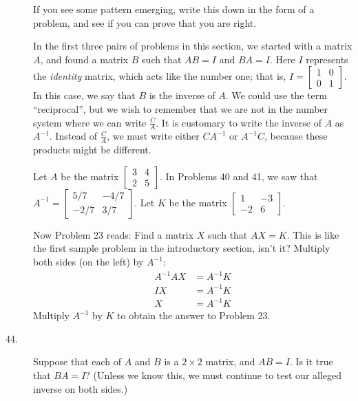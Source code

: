 \documentclass{article}
\begin{document}
\begin{description}
  \item[] If you see some pattern emerging, write this down in the form of a problem, and see if you can prove that you are right.

  \item[] In the first three pairs of problems in this section, we started with a matrix $A$, and found a matrix $B$ such that $AB = I$ and $BA = I$. Here $I$ represents the \emph{identity} matrix, which acts like the number one; that is, $I = \begin{bmatrix} 1 & 0 \\ 0 & 1 \end{bmatrix}$. In this case, we say that $B$ is the inverse of $A$. We could use the term ``reciprocal'', but we wish to remember that we are not in the number system where we can write $\frac{C}{A}$. It is customary to write the inverse of $A$ as $A^{-1}$. Instead of $\frac{C}{A}$, we must write either $CA^{-1}$ or $A^{-1}C$, because these products might be different.

  \item[] Let $A$ be the matrix $\begin{bmatrix} 3 & 4 \\ 2 & 5 \end{bmatrix}$. In Problems 40 and 41, we saw that $A^{-1} = \begin{bmatrix} 5/7 & -4/7 \\ -2/7 & 3/7 \end{bmatrix}$. Let $K$ be the matrix $\begin{bmatrix} 1 & -3 \\ -2 & 6 \end{bmatrix}$.

  \item[] Now Problem 23 reads: Find a matrix $X$ such that $AX = K$. This is like the first sample problem in the introductory section, isn't it? Multiply both sides (on the left) by $A^{-1}$:
    \begin{align*}
    A^{-1}AX & = A^{-1}K \\ 
          IX & = A^{-1}K \\ 
           X & = A^{-1}K
    \end{align*}
    Multiply $A^{-1}$ by $K$ to obtain the answer to Problem 23.

  \item[44.] Suppose that each of $A$ and $B$ is a $2 \times 2$ matrix, and $AB = I$. Is it true that $BA = I$? (Unless we know this, we must continue to test our alleged inverse on both sides.) 


\end{description}
\end{document}
